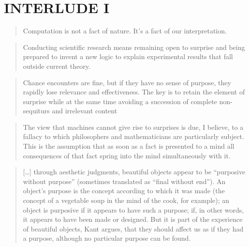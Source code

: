
\pagestyle{empty}

\chapter*{INTERLUDE I}
\label{interlude1}


\begin{quotation}
  Computation is not a fact of nature. It's a fact of our interpretation.
\end{quotation}

\begin{quotation}
  Conducting scientific research means remaining open to surprise and being prepared to invent a new logic to explain experimental results that fall outside current theory. 
\end{quotation}

\begin{quotation}
  Chance encounters are fine, but if they have no sense of purpose, they rapidly lose relevance and effectiveness. The key is to retain the element of surprise while at the same time avoiding a succession of complete non-sequiturs and irrelevant content 
\end{quotation}

\begin{quotation}
  The view that machines cannot give rise to surprises is due, I believe, to a fallacy to which philosophers and mathematicians are particularly subject. This is the assumption that as soon as a fact is presented to a mind all consequences of that fact spring into the mind simultaneously with it.
\end{quotation}

\begin{quotation}
  [\ldots] through aesthetic judgments, beautiful objects appear to be ``purposive without purpose'' (sometimes translated as ``final without end''). An object's purpose is the concept according to which it was made (the concept of a vegetable soup in the mind of the cook, for example); an object is purposive if it appears to have such a purpose; if, in other words, it appears to have been made or designed. But it is part of the experience of beautiful objects, Kant argues, that they should affect us as if they had a purpose, although no particular purpose can be found. 
\end{quotation}


\pagestyle{fania}


\clearpage